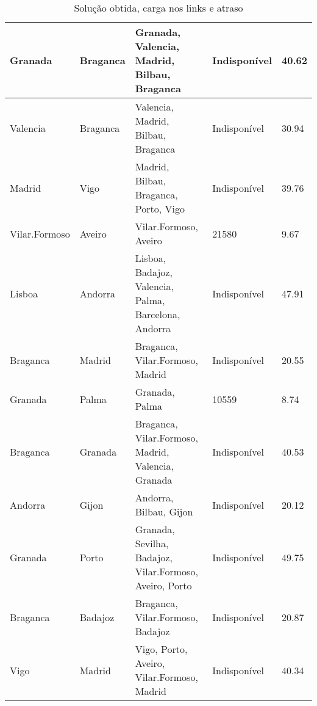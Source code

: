 \begin{table}[!htb]
{\begin{tabular}{|l|l|l|l|l|}
Granada & Braganca & Granada, Valencia, Madrid, Bilbau, Braganca & Indisponível & 40.62 \\ \hline
Valencia & Braganca & Valencia, Madrid, Bilbau, Braganca & Indisponível & 30.94 \\ \hline
Madrid & Vigo & Madrid, Bilbau, Braganca, Porto, Vigo & Indisponível & 39.76 \\ \hline
Vilar.Formoso & Aveiro & Vilar.Formoso, Aveiro & 21580 & 9.67 \\ \hline
Lisboa & Andorra & Lisboa, Badajoz, Valencia, Palma, Barcelona, Andorra & Indisponível & 47.91 \\ \hline
Braganca & Madrid & Braganca, Vilar.Formoso, Madrid & Indisponível & 20.55 \\ \hline
Granada & Palma & Granada, Palma & 10559 & 8.74 \\ \hline
Braganca & Granada & Braganca, Vilar.Formoso, Madrid, Valencia, Granada & Indisponível & 40.53 \\ \hline
Andorra & Gijon & Andorra, Bilbau, Gijon & Indisponível & 20.12 \\ \hline
Granada & Porto & Granada, Sevilha, Badajoz, Vilar.Formoso, Aveiro, Porto & Indisponível & 49.75 \\ \hline
Braganca & Badajoz & Braganca, Vilar.Formoso, Badajoz & Indisponível & 20.87 \\ \hline
Vigo & Madrid & Vigo, Porto, Aveiro, Vilar.Formoso, Madrid & Indisponível & 40.34 \\ \hline
\end{tabular}}
\caption[]{Solução obtida, carga nos links e atraso}
\end{table}

